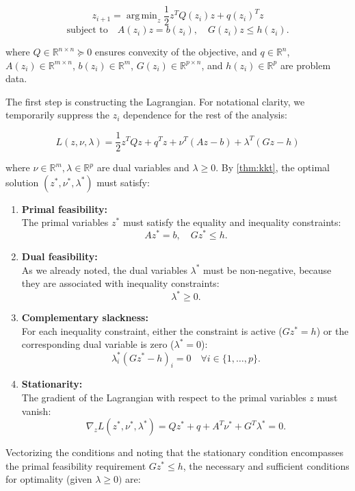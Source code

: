 \documentclass{article}
\DeclareMathOperator*{\argmin}{arg\,min}
\begin{document}
\[
z_{i+1} = \argmin_{z} \frac{1}{2} z^T Q(z_i) z + q(z_i)^T z
\]
\[
\text{subject to} \quad A(z_i) z = b(z_i), \quad G(z_i) z \leq h(z_i).
\]

where \( Q \in \mathbb{R}^{n \times n} \succeq 0 \) ensures convexity of the objective, and \( q \in \mathbb{R}^n \), 
\( A(z_i) \in \mathbb{R}^{m \times n} \), \( b(z_i) \in \mathbb{R}^m \), \( G(z_i) \in \mathbb{R}^{p \times n} \), and \( h(z_i) \in \mathbb{R}^p \) are problem data. 

The first step is constructing the Lagrangian. For notational clarity, we temporarily suppress the $z_i$ dependence for the rest of the analysis:

\[
L(z,\nu,\lambda) = \frac{1}{2}z^T Q z + q^T z + \nu^T(Az - b) + \lambda^T(Gz - h)
\]

where $\nu \in \mathbb{R}^m, \lambda \in \mathbb{R}^p$ are dual variables and $\lambda \geq 0$. By \ref{thm:kkt}, the optimal solution $(z^*, \nu^*, \lambda^*)$ must satisfy: 

\begin{enumerate}
    \item \textbf{Primal feasibility:} \\
    The primal variables $z^*$ must satisfy the equality and inequality constraints:
    \[
    Az^* = b, \quad Gz^* \leq h.
    \]

    \item \textbf{Dual feasibility:} \\
    As we already noted, the dual variables $\lambda^*$ must be non-negative, because they are associated with inequality constraints:
    \[
    \lambda^* \geq 0.
    \]

    \item \textbf{Complementary slackness:} \\
    For each inequality constraint, either the constraint is active ($Gz^* = h$) or the corresponding dual variable is zero ($\lambda^* = 0$):
    \[
    \lambda_i^* (Gz^* - h)_i = 0 \quad \forall i \in \{1, \ldots, p\}.
    \]

    \item \textbf{Stationarity:} \\
    The gradient of the Lagrangian with respect to the primal variables $z$ must vanish:
    \[
    \nabla_z L(z^*, \nu^*, \lambda^*) = Qz^* + q + A^T\nu^* + G^T\lambda^* = 0.
    \]
\end{enumerate}

Vectorizing the conditions and noting that the stationary condition encompasses the primal feasibility requirement $Gz^* \leq h$, the necessary and sufficient conditions for optimality (given $\lambda \geq 0)$ are: 
\end{document}
